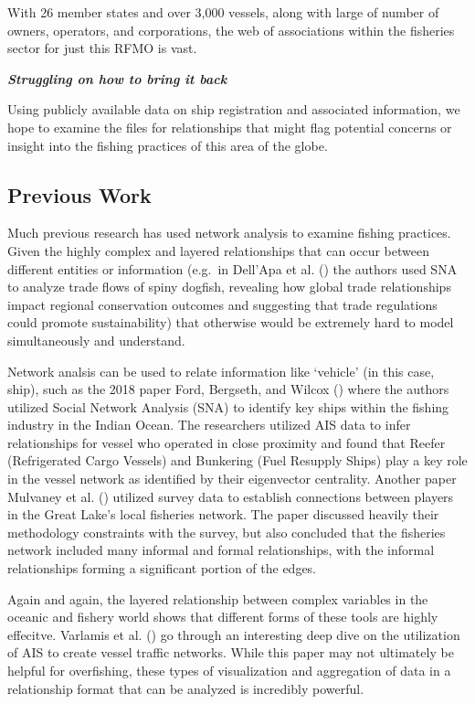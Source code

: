 \documentclass[
  letterpaper,
  DIV=11,
  numbers=noendperiod]{scrartcl}
\begin{document}
With 26 member states and over 3,000 vessels, along with large of number
of owners, operators, and corporations, the web of associations within
the fisheries sector for just this RFMO is vast.

\textbf{\emph{Struggling on how to bring it back}}

Using publicly available data on ship registration and associated
information, we hope to examine the files for relationships that might
flag potential concerns or insight into the fishing practices of this
area of the globe.

\subsection{Previous Work}\label{previous-work}

Much previous research has used network analysis to examine fishing
practices. Given the highly complex and layered relationships that can
occur between different entities or information (e.g.~in Dell'Apa et al.
() the authors used SNA
to analyze trade flows of spiny dogfish, revealing how global trade
relationships impact regional conservation outcomes and suggesting that
trade regulations could promote sustainability) that otherwise would be
extremely hard to model simultaneously and understand.

Network analsis can be used to relate information like `vehicle' (in
this case, ship), such as the 2018 paper Ford, Bergseth, and Wilcox
() where the authors utilized
Social Network Analysis (SNA) to identify key ships within the fishing
industry in the Indian Ocean. The researchers utilized AIS data to infer
relationships for vessel who operated in close proximity and found that
Reefer (Refrigerated Cargo Vessels) and Bunkering (Fuel Resupply Ships)
play a key role in the vessel network as identified by their eigenvector
centrality. Another paper Mulvaney et al.
() utilized survey data to
establish connections between players in the Great Lake's local
fisheries network. The paper discussed heavily their methodology
constraints with the survey, but also concluded that the fisheries
network included many informal and formal relationships, with the
informal relationships forming a significant portion of the edges.

Again and again, the layered relationship between complex variables in
the oceanic and fishery world shows that different forms of these tools
are highly effecitve. Varlamis et al.
() go through an interesting
deep dive on the utilization of AIS to create vessel traffic networks.
While this paper may not ultimately be helpful for overfishing, these
types of visualization and aggregation of data in a relationship format
that can be analyzed is incredibly powerful.
\end{document}
